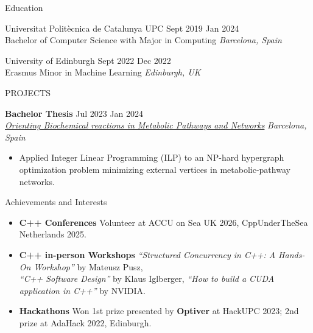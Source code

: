 \documentclass{resume} %
\begin{document}

\begin{rSection}{Education}

{Universitat Politècnica de Catalunya \textendash{} UPC} \hfill {Sept 2019 \textendash{} Jan 2024}\\
Bachelor of Computer Science with Major in Computing \hfill {\it Barcelona, Spain} 

{University of Edinburgh} \hfill {Sept 2022 \textendash{} Dec 2022}\\
{Erasmus \textendash{} Minor in Machine Learning} \hfill {\it Edinburgh, UK\/}

\end{rSection}


\begin{rSection}{PROJECTS}
    \vspace{-1.25em}
    \item \textbf{Bachelor Thesis} \hfill Jul 2023 \textendash{} Jan 2024 \\
    \href{https://github.com/ZephyrSV/tfg_python}{\it Orienting Biochemical reactions in Metabolic Pathways and Networks} \hfill {\it Barcelona, Spain} 
    \begin{itemize}
        \item {Applied Integer Linear Programming (ILP) to an NP-hard hypergraph optimization problem \textendash{} minimizing external vertices in metabolic-pathway networks.}
    \end{itemize}
\end{rSection} 

\begin{rSection}{Achievements and Interests}
    \begin{itemize}
        \item \textbf{C++ Conferences} {Volunteer at ACCU on Sea UK 2026, CppUnderTheSea Netherlands 2025.}
        \item \textbf{C++ in-person Workshops} {\textit{``Structured Concurrency in C++: A Hands-On Workshop''} by Mateusz Pusz, \\
        \textit{``C++ Software Design''} by Klaus Iglberger, \textit{``How to build a CUDA application in C++''} by NVIDIA.}
        \item \textbf{Hackathons} { Won 1st prize presented by {\bf Optiver} at HackUPC 2023; 2nd prize at AdaHack 2022, Edinburgh.}
    \end{itemize}
\end{rSection}
\end{document}
